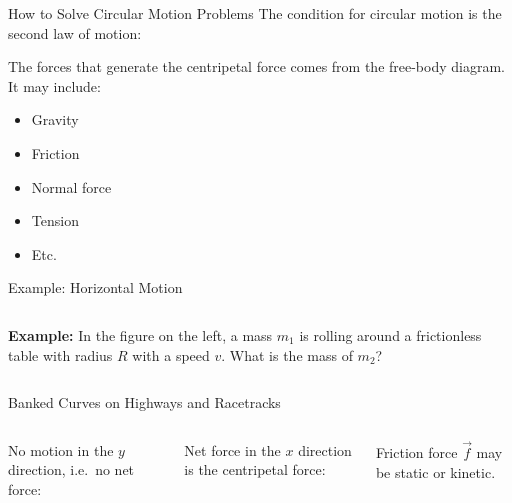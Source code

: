 \documentclass[12pt,compress,aspectratio=169]{beamer}
\begin{document}
\begin{frame}{How to Solve Circular Motion Problems}
  The condition for circular motion is the second law of motion:

  
  The forces that generate the centripetal force comes from the free-body
  diagram. It may include:
  \begin{itemize}
  \item Gravity
  \item Friction
  \item Normal force
  \item Tension
  \item Etc.
  \end{itemize}
\end{frame}



\begin{frame}{Example: Horizontal Motion}
  \begin{columns}
    
    \textbf{Example:} In the figure on the left, a mass $m_1$ is rolling around
    a frictionless table with radius $R$ with a speed $v$. What is the mass of
    $m_2$?
  \end{columns}
\end{frame}


\begin{frame}{Banked Curves on Highways and Racetracks}
  \begin{columns}
    \centering
    

    No motion in the $y$ direction, i.e.\ no net force:


    Net force in the $x$ direction is the centripetal force:


    Friction force $\vec f$ may be static or kinetic.
  \end{columns}
\end{frame}
\end{document}
